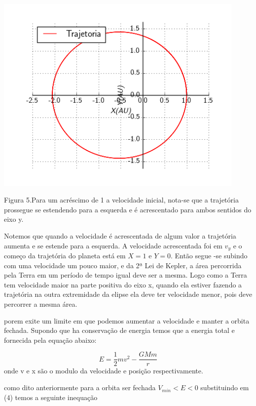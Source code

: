 \documentclass[a4paper]{article} %
\begin{document}
\begin{center}
	\includegraphics[width=4.80in,height=3.84in, keepaspectratio=false]{image4_15-50-59-718000.png}
	
	\scriptsize{Figura 5.Para um acréscimo de 1 a velocidade inicial, nota-se que a trajetória prossegue se estendendo para a esquerda e é acrescentado para ambos sentidos do eixo y.}
\end{center}

Notemos que quando a velocidade é acrescentada de algum valor a trajetória aumenta e se estende para a esquerda. A velocidade acrescentada foi em $v_y$ e o começo da trajetória do planeta está em $X=1$ e $Y=0$. Então segue -se subindo com uma velocidade um pouco maior, e da 2ª Lei de Kepler, a área percorrida pela Terra em um período de tempo igual deve ser a mesma. Logo como a Terra tem velocidade maior na parte positiva do eixo x, quando ela estiver fazendo a trajetória na outra extremidade da elipse ela deve ter velocidade menor, pois deve percorrer a mesma área.

porem exite um limite em que podemos aumentar a velocidade e manter a orbita fechada. Supondo que ha conservação de energia temos que a energia total e fornecida pela equação abaixo:

\begin{equation}
	E = \frac{1}{2}mv^2 - \frac{GMm}{r}
\end{equation} 
onde v e x são o modulo da velocidade e posição respectivamente.

como dito anteriormente para a orbita ser fechada $V_{min}< E < 0$ substituindo em (4) temos a seguinte inequação
\end{document}
